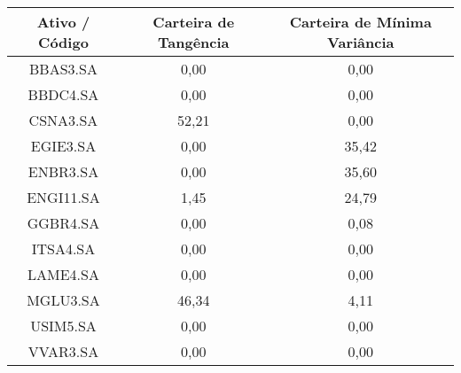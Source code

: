 \begin{table}[!h]

\begin{tabular}{ccc}
\toprule
\textbf{Ativo / Código} & \textbf{Carteira de Tangência} & \textbf{Carteira de Mínima Variância}\\
\midrule
BBAS3.SA & 0,00 & 0,00\\
BBDC4.SA & 0,00 & 0,00\\
CSNA3.SA & 52,21 & 0,00\\
EGIE3.SA & 0,00 & 35,42\\
ENBR3.SA & 0,00 & 35,60\\
ENGI11.SA & 1,45 & 24,79\\
GGBR4.SA & 0,00 & 0,08\\
ITSA4.SA & 0,00 & 0,00\\
LAME4.SA & 0,00 & 0,00\\
MGLU3.SA & 46,34 & 4,11\\
USIM5.SA & 0,00 & 0,00\\
VVAR3.SA & 0,00 & 0,00\\
\bottomrule
\end{tabular}
\end{table}